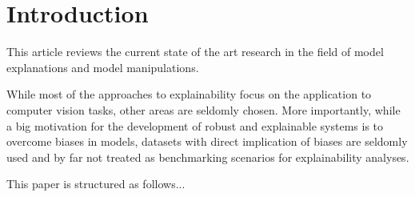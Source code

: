 \section{Introduction}
\label{sec:introduction}

This article reviews the current state of the art research in the field of model explanations and model manipulations. 



While most of the approaches to explainability focus on the application to computer vision tasks, other areas are seldomly chosen. 
More importantly, while a big motivation for the development of robust and explainable systems is to overcome biases in models, datasets with 
direct implication of biases are seldomly used and by far not treated as benchmarking scenarios for explainability analyses.  



This paper is structured as follows... 